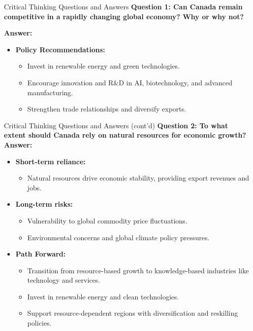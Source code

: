 \documentclass{beamer}
\begin{document}
\begin{frame}{Critical Thinking Questions and Answers}
  \textbf{Question 1: Can Canada remain competitive in a rapidly changing global economy? Why or why not?}

  \textbf{Answer:}
  \begin{itemize}

    \item \textbf{Policy Recommendations:}
      \begin{itemize}
        \item Invest in renewable energy and green technologies.
        \item Encourage innovation and R$\&$D in AI, biotechnology, and advanced manufacturing.
        \item Strengthen trade relationships and diversify exports.
      \end{itemize}
  \end{itemize}
\end{frame}






\begin{frame}{Critical Thinking Questions and Answers (cont'd)}
  \textbf{Question 2: To what extent should Canada rely on natural resources for economic growth?}
  \pause
  \textbf{Answer:}
  \begin{itemize}
    \item \textbf{Short-term reliance:}
      \begin{itemize}
        \item Natural resources drive economic stability, providing export revenues and jobs.
      \end{itemize}
    \item \textbf{Long-term risks:}
      \begin{itemize}
        \item Vulnerability to global commodity price fluctuations.
        \item Environmental concerns and global climate policy pressures.
      \end{itemize}
    \item \textbf{Path Forward:}
      \begin{itemize}
        \item Transition from resource-based growth to knowledge-based industries like technology and services.
        \item Invest in renewable energy and clean technologies.
        \item Support resource-dependent regions with diversification and reskilling policies.
      \end{itemize}
  \end{itemize}
\end{frame}
\end{document}
